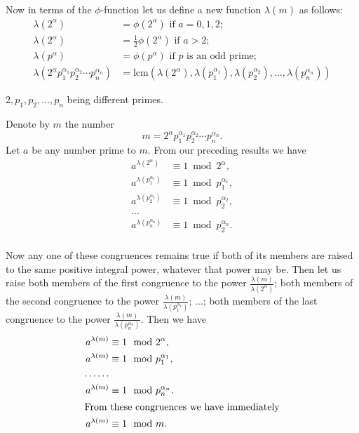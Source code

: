 Now in terms of the $\phi$-function let us define a new function
$\lambda(m)$ as follows:
\begin{align*}
\lambda(2^{\alpha}) &= \phi(2^{\alpha}) \text{ if $a = 0, 1, 2$;} \\
\lambda(2^{\alpha}) &= \frac{1}{2}\phi(2^{\alpha})
                                               \text{ if $a > 2$;} \\
\lambda(p^{\alpha}) &= \phi(p^{\alpha})
                                   \text{ if $p$ is an odd prime;} \\
\lambda(2^{\alpha} p_1^{\alpha_1} p_2^{\alpha_2} \cdots p_n^{\alpha_n}) 
&= \text{lcm}(
    \lambda(2^{\alpha}),
    \lambda(p_1^{\alpha_1}),
    \lambda(p_2^{\alpha_2}), \ldots, \lambda(p_n^{\alpha_n}
    )
)
\end{align*}

$2, p_1, p_2, \ldots, p_n$ being different primes.%

Denote by $m$ the number
\begin{equation*}
m = 2^{\alpha}p_1^{\alpha_1}p_2^{\alpha_2} \cdots p_n^{\alpha_n}.
\end{equation*}
Let $a$ be any number prime to $m$. From our preceding results we
have
\begin{align*}
a^{\lambda(2^{\alpha})}     &\equiv 1 \bmod 2^{\alpha}, \\
a^{\lambda(p_1^{\alpha_1})} &\equiv 1 \bmod p_1^{\alpha_1},\\
a^{\lambda(p_2^{\alpha_2})} &\equiv 1 \bmod p_2^{\alpha_2}, \\
\ldots \\
a^{\lambda(p_n^{\alpha_n})} &\equiv 1 \bmod p_2^{\alpha_n}. \\
\end{align*}

Now any one of these congruences remains true if both of its members
are raised to the same positive integral power, whatever that power
may be. Then let us raise both members of the first congruence to
the power $\frac{\lambda(m)}{\lambda(2^\alpha)}$; both members of
the second congruence to the power
$\frac{\lambda(m)}{\lambda(p_1^{\alpha_1})}$; $\ldots$; both members
of the last congruence to the power
$\frac{\lambda(m)}{\lambda(p_n^{\alpha_n})}$. Then we have
\begin{align*}
a^{\lambda(m)} &\equiv 1 \mod 2^\alpha, \\
a^{\lambda(m)} &\equiv 1 \mod p_1^{\alpha_1}, \\
\ldots \ldots \\
a^{\lambda(m)} &\equiv 1 \mod p_n^{\alpha_n}. \\
\intertext{From these congruences we have immediately}
a^{\lambda(m)} &\equiv 1 \mod m.
\end{align*}

